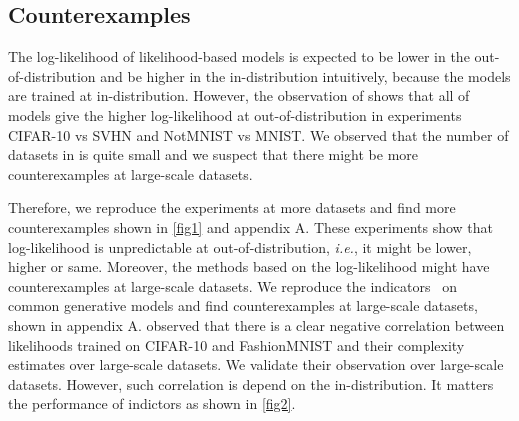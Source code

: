 \documentclass[letterpaper]{article} %
\newcommand{\IE}{\textit{i.e.}, }
\begin{document}
\subsection{Counterexamples}
The log-likelihood of likelihood-based models is expected to be lower in the out-of-distribution and be higher in the in-distribution intuitively, because the models are trained at in-distribution. 
However, the observation of \cite{nalisnick2018deep} shows that all of models give the higher log-likelihood at out-of-distribution in experiments CIFAR-10 vs SVHN and NotMNIST vs MNIST. 
We observed that the number of datasets in \cite{nalisnick2018deep} is quite small and we suspect that there might be more counterexamples at large-scale datasets. 

Therefore, we reproduce the experiments at more datasets and find more counterexamples shown in \ref{fig1} and appendix A. 
These experiments show that log-likelihood is unpredictable at out-of-distribution, \IE it might be lower, higher or same. 
Moreover, the methods based on the log-likelihood might have counterexamples at large-scale datasets. 
We reproduce the indicators~\cite{alemi2018uncertainty,song2017pixeldefend,ren2019likelihood,song2019generative,nalisnick2018deep,che2019deep,alemi2018uncertainty} on common generative models and find counterexamples at large-scale datasets, shown in appendix A. \cite{nalisnick2018deep} observed that there is a clear negative correlation between likelihoods trained on CIFAR-10 and FashionMNIST and their complexity estimates over large-scale datasets. We validate their observation over large-scale datasets. However, such correlation is depend on the in-distribution. It matters the performance of indictors as shown in \cref{fig2}. 
\end{document}
